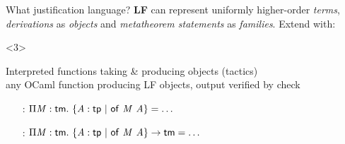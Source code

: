 \documentclass{beamer}
\theoremstyle{example}
\begin{document}
\begin{frame}{What justification language?}
  \textbf{LF} can represent uniformly higher-order \emph{terms},
  \emph{derivations} as \emph{objects} and \emph{metatheorem
    statements} as \emph{families}. \pause Extend with:
  \begin{overlayarea}\textwidth{18em}
    \begin{onlyenv}<3>
      \begin{block}{Interpreted functions} taking \& producing objects (tactics) \\
        {\footnotesize any OCaml function producing LF objects, output
          verified by \textsf{check}}
        \begin{examples}
          \small
          \begin{enumerate}[inline]
          \item[\const{infer} :] $\Pi{\ensuremath{\text{\textit{M}}}}:{\text{\textsf{tm}}}.\ 
            \{{\text{\textit{A}}}:{\text{\textsf{tp}}}\ |\ {{\text{\textsf{of}}}\ {\text{\textit{M}}}\ {\text{\textit{A}}}}\} = \ldots$ \\

          \item[\const{get} :] $\Pi{\ensuremath{\text{\textit{M}}}}:{\text{\textsf{tm}}}.\  \{{\text{\textit{A}}}:{\text{\textsf{tp}}}\ |\ {{\text{\textsf{of}}}\ {\text{\textit{M}}}\ {\text{\textit{A}}}}\}
            \to \text{\textsf{tm}}= \ldots$


\end{enumerate}
\end{examples}
\end{block}
\end{onlyenv}
\end{overlayarea}
\end{frame}
\end{document}
